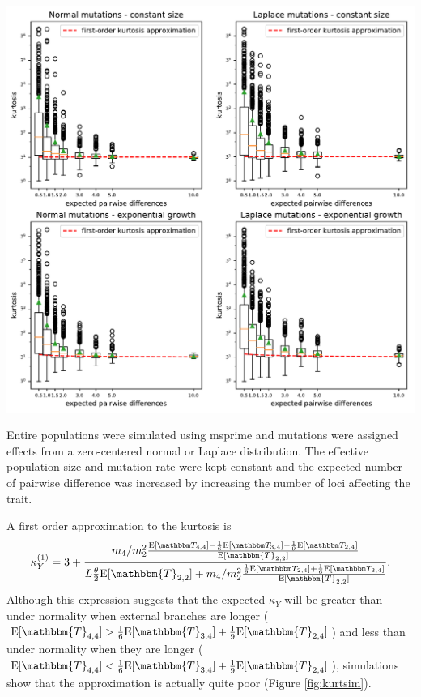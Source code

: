 \begin{center}
  \centering \includegraphics[width=\textwidth]{figures/kurt_sim.pdf}
  \label{fig:kurtsim}
\end{center}
Entire populations were simulated using msprime \citep{Kelleher2015} and
mutations were assigned effects from a zero-centered normal or Laplace
distribution. The effective population size and mutation rate were kept constant
and the expected number of pairwise difference was increased by increasing the
number of loci affecting the trait.

A first order approximation to the kurtosis is
\begin{equation}
    \label{eq:firstord} 
\kappa_Y^{(1)} = 3 + \frac{m_4/m_2^2 \frac{\CCC}{\E[\mathbbm{T}_{2,2}]}} {L \T \E[\mathbbm{T}_{2,2}]
    + m_4/m_2^2 \frac{\BBB}{\E[\mathbbm{T}_{2,2}]}}.
\end{equation}
Although this expression suggests that the expected $\kappa_Y$ will be greater
than under normality when external branches are longer ($\E[\mathbbm{T}_{4,4}] >
\frac{1}{6}\E[\mathbbm{T}_{3,4}] + \frac{1}{9}\E[\mathbbm{T}_{2,4}]$) and less
than under normality when they are longer ($\E[\mathbbm{T}_{4,4}] <
\frac{1}{6}\E[\mathbbm{T}_{3,4}] + \frac{1}{9}\E[\mathbbm{T}_{2,4}]$),
simulations show that the approximation is actually quite poor (Figure
\ref{fig:kurtsim}).
